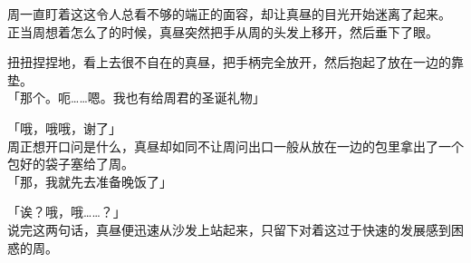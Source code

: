 周一直盯着这这令人总看不够的端正的面容，却让真昼的目光开始迷离了起来。\\

正当周想着怎么了的时候，真昼突然把手从周的头发上移开，然后垂下了眼。

扭扭捏捏地，看上去很不自在的真昼，把手柄完全放开，然后抱起了放在一边的靠垫。\\

「那个。呃……嗯。我也有给周君的圣诞礼物」

「哦，哦哦，谢了」\\

周正想开口问是什么，真昼却如同不让周问出口一般从放在一边的包里拿出了一个包好的袋子塞给了周。\\

「那，我就先去准备晚饭了」

「诶？哦，哦……？」\\

说完这两句话，真昼便迅速从沙发上站起来，只留下对着这过于快速的发展感到困惑的周。
